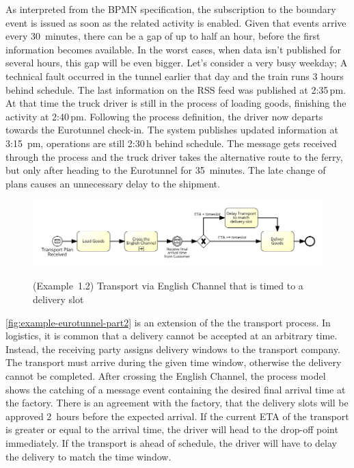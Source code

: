 As interpreted from the BPMN specification, the subscription to the boundary event is issued as soon as the related activity is enabled.
Given that events arrive every 30~minutes, there can be a gap of up to half an hour, before the first information becomes available.
In the worst cases, when data isn't published for several hours, this gap will be even bigger.
Let's consider a very busy weekday; A technical fault occurred in the tunnel earlier that day and the train runs 3 hours behind schedule.
The last information on the RSS feed was published at 2:35\,pm. At that time the truck driver is still in the process of loading goods, finishing the activity at 2:40\,pm.
Following the process definition, the driver now departs towards the Eurotunnel check-in.
The system publishes updated information at 3:15~pm, operations are still 2:30\,h behind schedule. The message gets received through the process and the truck driver takes the alternative route to the ferry, but only after heading to the Eurotunnel for 35~minutes. The late change of plans causes an unnecessary delay to the shipment.

\begin{figure}[]
	\myfloatalign
	{\includegraphics[width=1\linewidth]{chapters/requirements/Eurotunnel_part2.png}}
	\caption{(Example~1.2) Transport via English Channel that is timed to a delivery slot }
	\label{fig:example-eurotunnel-part2}
\end{figure}

\autoref{fig:example-eurotunnel-part2} is an extension of the the transport process.
In logistics, it is common that a delivery cannot be accepted at an arbitrary time. Instead, the receiving party assigns delivery windows to the transport company.
The transport must arrive during the given time window, otherwise the delivery cannot be completed.
After crossing the English Channel, the process model shows the catching of a message event containing the desired final arrival time at the factory. There is an agreement with the factory, that the delivery slots will be approved 2~hours before the expected arrival.
If the current ETA of the transport is greater or equal to the arrival time, the driver will head to the drop-off point immediately. If the transport is ahead of schedule, the driver will have to delay the delivery to match the time window.

